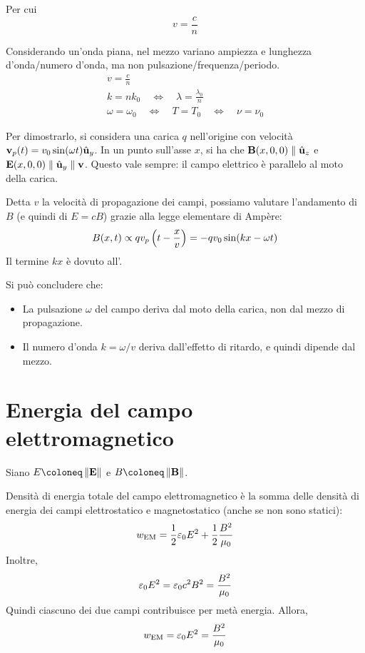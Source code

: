 Per cui
\begin{equation}
    v = \frac{c}{n}
\end{equation}

Considerando un'onda piana, nel mezzo variano ampiezza e lunghezza d'onda/numero d'onda, ma non pulsazione/frequenza/periodo.
\begin{gather}
    v = \frac{c}{n} \\
    k = n k_0
    \quad \iff \quad
    \lambda = \frac{\lambda_0}{n} \\
    \omega = \omega_0
    \quad \iff \quad
    T = T_0
    \quad \iff \quad
    \nu = \nu_0
\end{gather}

Per dimostrarlo, si considera una carica $q$ nell'origine con velocità $\mathbf{v}_p(t) = v_0 \sin(\omega t) \hat{\mathbf{u}}_{y}$.
In un punto sull'asse $x$, si ha che $\mathbf{B}(x, 0, 0) \parallel \hat{\mathbf{u}}_{z}$ e $\mathbf{E}(x, 0, 0) \parallel \hat{\mathbf{u}}_{y} \parallel \mathbf{v}$.
Questo vale sempre: il campo elettrico è parallelo al moto della carica.

Detta $v$ la velocità di propagazione dei campi, possiamo valutare l'andamento di $B$ (e quindi di $E = c B$) grazie alla legge elementare di Ampère:
\begin{equation}
    B(x, t) \propto q v_p\left( t - \frac{x}{v} \right) = - q v_0 \sin(k x - \omega t)
\end{equation}
Il termine $k x$ è dovuto all'.

Si può concludere che:
\begin{itemize}
    \item La pulsazione $\omega$ del campo deriva dal moto della carica, non dal mezzo di propagazione.
    \item Il numero d'onda $k = \omega / v$ deriva dall'effetto di ritardo, e quindi dipende dal mezzo.
\end{itemize}


\section{Energia del campo elettromagnetico}

Siano $E \coloneq \norm{\E}$ e $B \coloneq \norm{\B}$.

Densità di energia totale del campo elettromagnetico è la somma delle densità di energia dei campi elettrostatico e magnetostatico (anche se non sono statici):
\begin{equation}
    w_\mathrm{EM} = \frac{1}{2} \varepsilon_0 E^2 + \frac{1}{2} \frac{B^2}{\mu_0}
\end{equation}
Inoltre,
\begin{equation}
    \varepsilon_0 E^2 = \varepsilon_0 c^2 B^2 = \frac{B^2}{\mu_0}
\end{equation}
Quindi ciascuno dei due campi contribuisce per metà energia.
Allora,
\begin{equation}
    w_\mathrm{EM} = \varepsilon_0 E^2 = \frac{B^2}{\mu_0}
\end{equation}

